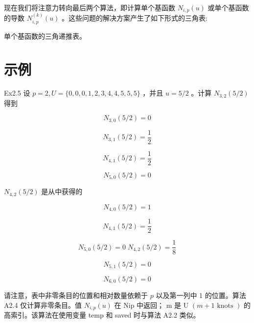 \documentclass[../main.tex]{subfiles}
\begin{document}
现在我们将注意力转向最后两个算法，即计算单个基函数 \({N}_{i,p}\left( u\right)\) 或单个基函数的导数 \({N}_{i,p}^{\left( k\right) }\left( u\right)\) 。这些问题的解决方案产生了如下形式的三角表:

\begin{center}
\begin{minipage}{12cm}
\vspace*{.6\baselineskip}
\centering
{}
\par\smallskip
单个基函数的三角递推表。
\end{minipage}
\end{center} 

\section*{示例}

Ex2.5 设 \(p = 2,U = \{ 0,0,0,1,2,3,4,4,5,5,5\}\) ，并且 \(u = 5/2\) 。计算 \({N}_{3,2}\left( {5/2}\right)\) 得到

\[
{N}_{3,0}\left( {5/2}\right)  = 0
\]

\[
{N}_{3,1}\left( {5/2}\right)  = \frac{1}{2}
\]

\[
{N}_{4,1}\left( {5/2}\right)  = \frac{1}{2}
\]

\[
{N}_{5,0}\left( {5/2}\right)  = 0
\]

\({N}_{4,2}\left( {5/2}\right)\) 是从中获得的

\[
{N}_{4,0}\left( {5/2}\right)  = 1
\]

\[
{N}_{4,1}\left( {5/2}\right)  = \frac{1}{2}
\]

\[
{N}_{5,0}\left( {5/2}\right)  = 0\;{N}_{4,2}\left( {5/2}\right)  = \frac{1}{8}
\]

\[
{N}_{5,1}\left( {5/2}\right)  = 0
\]

\[
{N}_{6,0}\left( {5/2}\right)  = 0
\]

请注意，表中非零条目的位置和相对数量依赖于 \(p\) 以及第一列中 1 的位置。算法 A2.4 仅计算非零条目。值 \({N}_{i,p}\left( u\right)\) 在 Nip 中返回； \(\mathrm{m}\) 是 U \(\left( {m + 1\text{ knots }}\right)\) 的高索引。该算法在使用变量 temp 和 saved 时与算法 A2.2 类似。
\end{document}
